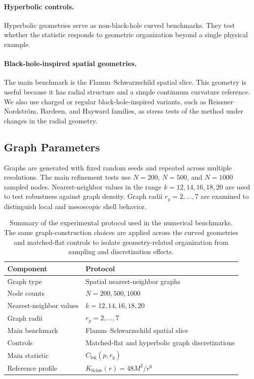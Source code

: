 \documentclass{svproc}
\begin{document}
\paragraph{Hyperbolic controls.}
Hyperbolic geometries serve as non-black-hole curved benchmarks. They test whether the statistic responds to geometric organization beyond a single physical example.

\paragraph{Black-hole-inspired spatial geometries.}
The main benchmark is the Flamm--Schwarzschild spatial slice. This geometry is useful because it has radial structure and a simple continuum curvature reference. We also use charged or regular black-hole-inspired variants, such as Reissner--Nordstr\"om, Bardeen, and Hayward families, as stress tests of the method under changes in the radial geometry.

\subsection{Graph Parameters}

Graphs are generated with fixed random seeds and repeated across multiple resolutions. The main refinement tests use $N=200$, $N=500$, and $N=1000$ sampled nodes. Nearest-neighbor values in the range $k=12,14,16,18,20$ are used to test robustness against graph density. Graph radii $r_g=2,\ldots,7$ are examined to distinguish local and mesoscopic shell behavior.

\begin{table}
\centering
\caption{Summary of the experimental protocol used in the numerical benchmarks. The same graph-construction choices are applied across the curved geometries and matched-flat controls to isolate geometry-related organization from sampling and discretization effects.}
\label{tab:protocol}
\begin{tabular}{ll}
\toprule
Component & Protocol \\
\midrule
Graph type & Spatial nearest-neighbor graphs \\
Node counts & $N=200,500,1000$ \\
Nearest-neighbor values & $k=12,14,16,18,20$ \\
Graph radii & $r_g=2,\ldots,7$ \\
Main benchmark & Flamm--Schwarzschild spatial slice \\
Controls & Matched-flat and hyperbolic graph discretizations \\
Main statistic & $C_{\log}(p,r_g)$ \\
Reference profile & $K_{\mathrm{Schw}}(r)=48M^2/r^6$ \\
\bottomrule
\end{tabular}
\end{table}
\end{document}
